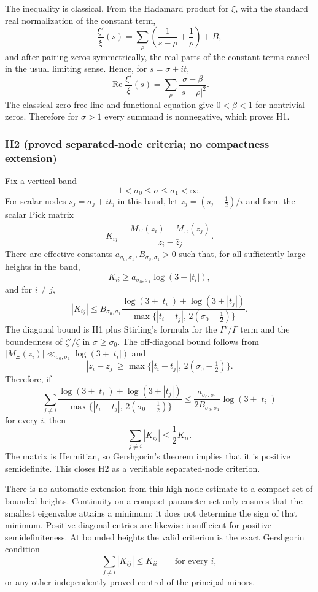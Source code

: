 \documentclass[11pt]{amsart}
\theoremstyle{definition}
\theoremstyle{remark}
\theoremstyle{definition}
\renewcommand{\Re}{\operatorname{Re}}
\newcommand{\half}{\tfrac{1}{2}}
\begin{document}
The inequality is classical.  From the Hadamard product for $\xi$, with the standard real normalization
of the constant term,
\[
   \frac{\xi'}{\xi}(s)
   =
   \sum_\rho\left(\frac1{s-\rho}+\frac1\rho\right)+B,
\]
and after pairing zeros symmetrically, the real parts of the constant terms cancel in the usual limiting
sense.  Hence, for $s=\sigma+it$,
\[
   \Re\frac{\xi'}{\xi}(s)
   =
   \sum_\rho\frac{\sigma-\beta}{|s-\rho|^2}.
\]
The classical zero-free line and functional equation give $0<\beta<1$ for nontrivial zeros.  Therefore
for $\sigma>1$ every summand is nonnegative, which proves H1.

\subsubsection*{H2 (proved separated-node criteria; no compactness extension)}

Fix a vertical band
\[
   1<\sigma_0\le\sigma\le\sigma_1<\infty.
\]
For scalar nodes $s_j=\sigma_j+it_j$ in this band, let $z_j=(s_j-\half)/i$ and form the scalar Pick
matrix
\[
   K_{ij}
   =
   \frac{M_\Xi(z_i)-\overline{M_\Xi(z_j)}}{z_i-\bar z_j}.
\]
There are effective constants $a_{\sigma_0,\sigma_1},B_{\sigma_0,\sigma_1}>0$ such that, for all
sufficiently large heights in the band,
\[
   K_{ii}\ge a_{\sigma_0,\sigma_1}\log(3+|t_i|),
\]
and for $i\ne j$,
\[
   |K_{ij}|
   \le
   B_{\sigma_0,\sigma_1}
   \frac{\log(3+|t_i|)+\log(3+|t_j|)}
        {\max\{|t_i-t_j|,\,2(\sigma_0-\half)\}}.
\]
The diagonal bound is H1 plus Stirling's formula for the $\Gamma'/\Gamma$ term and the boundedness of
$\zeta'/\zeta$ in $\sigma\ge\sigma_0$.  The off-diagonal bound follows from
$|M_\Xi(z_i)|\ll_{\sigma_0,\sigma_1}\log(3+|t_i|)$ and
\[
   |z_i-\bar z_j|\ge\max\{|t_i-t_j|,\,2(\sigma_0-\half)\}.
\]
Therefore, if
\[
   \sum_{j\ne i}
   \frac{\log(3+|t_i|)+\log(3+|t_j|)}
        {\max\{|t_i-t_j|,\,2(\sigma_0-\half)\}}
   \le
   \frac{a_{\sigma_0,\sigma_1}}{2B_{\sigma_0,\sigma_1}}\log(3+|t_i|)
\]
for every $i$, then
\[
   \sum_{j\ne i}|K_{ij}|\le\frac12 K_{ii}.
\]
The matrix is Hermitian, so Gershgorin's theorem implies that it is positive semidefinite.  This closes
H2 as a verifiable separated-node criterion.

There is no automatic extension from this high-node estimate to a compact set of bounded heights.
Continuity on a compact parameter set only ensures that the smallest eigenvalue attains a minimum; it
does not determine the sign of that minimum.  Positive diagonal entries are likewise insufficient for
positive semidefiniteness.  At bounded heights the valid criterion is the exact Gershgorin condition
\[
   \sum_{j\ne i}|K_{ij}|\le K_{ii}\qquad\text{for every }i,
\]
or any other independently proved control of the principal minors.
\end{document}
